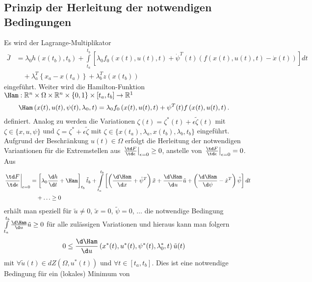 \subsection{Prinzip der Herleitung der notwendigen Bedingungen}
Es wird der Lagrange-Multiplikator
\begin{align*}
	\bar{J} & = \lambda_0 h\left(x(t_b),t_b \right) + \int\limits_{t_a}^{t_b}\left[\lambda_0 f_0(x(t),u(t),t) + \dot{\psi}^T(t)\left(f(x(t),u(t),t) -
	\dot{x}(t) \right) \right]dt\\
	&\quad + \lambda_a^T\left\{x_a - x(t_a) \right\} + \lambda_b^T z(x(t_b))
\end{align*}
eingeführt. Weiter wird die Hamilton-Funktion $\Ham:\mathbb{R}^n\times\Omega\times\mathbb{R}^n\times\{0,1\}\times[t_a,t_b]\rightarrow\mathbb{R}^1$
\begin{align*}
	\Ham \left(x(t),u(t),\psi(t),\lambda_0,t \right) & = \lambda_0 f_0\left(x(t),u(t),t \right) + \psi^T(t)f\left(x(t),u(t),t \right). 
\end{align*}
definiert. Analog zu  werden die Variationen $\zeta(t)=\zeta^{\ast}(t)+\epsilon\tilde{\zeta}(t)$ mit
$\zeta\in\{x,u,\psi \}$ und $\zeta=\zeta^{\ast}+\epsilon\tilde{\zeta}$ mit $\zeta\in\{x(t_a),\lambda_a, x(t_b), \lambda_b, t_b\}$ eingeführt. Aufgrund
der Beschränkung $u(t)\in\Omega$ erfolgt die Herleitung der notwendigen Variantionen für die Extremstellen aus $\left.\frac{\td F}{\td
\epsilon}\right|_{\epsilon=0}\geq 0$, anstelle von $\left.\frac{\td F}{\td \epsilon}\right|_{\epsilon=0} = 0$. Aus 
\begin{align*}
	\left.\frac{\td F}{\td \epsilon}\right|_{\epsilon=0} & = \left[\lambda_0\frac{\d h}{\d t}+\Ham \right]_{t_b}\tilde{t}_b +
	\int\limits_{t_a}^{t_b}\left[\left(\frac{\d \Ham}{\d x}+\dot{\psi}^T \right)\tilde{x} + \frac{\d \Ham}{\d u}\tilde{u} + \left(\frac{\d \Ham}{\d \psi}
	-\dot{x}^T \right)\tilde{\psi}\right]dt\\
	& \quad + \ldots \geq 0
\end{align*}
erhält man speziell für $\tilde{u}\neq 0$, $\tilde{x}=0$, $\tilde{\psi}=0$, $\ldots$ die notwendige Bedingung $\int\limits_{t_a}^{t_b}\frac{\d\Ham}{\d
u}\tilde{u}\geq 0$ für alle zulässigen Variationen und hieraus kann man folgern
\begin{align*}
0 & \leq \frac{\d \Ham}{\d u}\left(x^{\ast}(t), u^{\ast}(t), \psi^{\ast}(t),\lambda_0^{\ast},t \right)\tilde{u}(t)
\end{align*}
mit $\forall \tilde{u}(t)\in dZ(\Omega,u^{\ast}(t))$ und $\forall t\in[t_a,t_b]$. Dies ist eine notwendige Bedingung für ein (lokales) Minimum von
